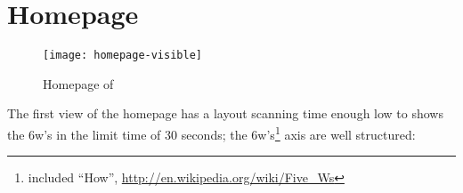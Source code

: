 \documentclass[
12pt, %
a4paper, %
oneside, %
headinclude,footinclude, %
BCOR5mm, %
]{scrartcl}
\begin{document}

\newpage
\section{Homepage}

\begin{figure}[h]
\centering 
\centerline{\texttt{[image: homepage-visible]}}
\caption[Homepage]{Homepage of \thesite{}}
\label{fig:homepage} 
\end{figure}

The first view of the homepage has a layout scanning time enough low to shows the 6w's in the limit time of 30 seconds; the 6w's\footnote{included ``How'', \url{http://en.wikipedia.org/wiki/Five_Ws}} axis are well structured:
\end{document}
